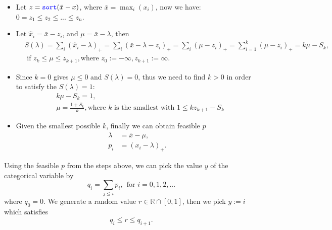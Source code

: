 \documentclass[12pt]{article}
\begin{document}
\begin{itemize}
	\item Let $z = \codeword{sort}(\bar{x} - x)$, where $\bar{x} = \max_i(x_i)$, now we have: $0=z_1\leq z_2 \leq ... \leq z_n$.
	\item Let $\hat{x}_i = \bar{x} - z_i$, and $\mu = \bar{x} - \lambda$, then
	\begin{equation*}
		\begin{split}
			&S(\lambda) = \sum_i (\hat{x}_i - \lambda)_+ = \sum_i (\bar{x} - \lambda - z_i)_+ = \sum_i (\mu - z_i)_+ = \sum_{i=1}^k (\mu - z_i)_+ = k\mu - S_k, \\
			&\text{ if } z_k \leq \mu \leq z_{k+1}, \text{where }z_0 := -\infty, z_{k+1} := \infty.
		\end{split}
	\end{equation*}
	\item Since $k=0$ gives $\mu \leq 0$ and $S(\lambda) = 0$, thus we need to find $k>0$ in order to satisfy the $S(\lambda) = 1$:
	\begin{equation*}
		\begin{split}
			&k\mu - S_k=1, \\
			&\mu = \frac{1+S_k}{k}, \text{where $k$ is the smallest with } 1 \leq kz_{k+1} - S_k
		\end{split}
	\end{equation*}
	\item Given the smallest possible $k$, finally we can obtain feasible $p$
	\begin{equation*}
		\begin{split}
			\lambda &= \bar{x} - \mu, \\
			p_i &= (x_i - \lambda)_+.	
		\end{split}
	\end{equation*}
\end{itemize}
Using the feasible $p$ from the steps above, we can pick the value $y$ of the categorical variable by
\begin{equation*}
	q_i = \sum_{j\leq i} p_i,~~ \text{for }i = 0,1,2,...
\end{equation*}
where $q_0 = 0$. We generate a random value $r \in \mathbb{R} \cap [0,1]$, then we pick $y := i$ which satisfies
\begin{equation*}
	q_i \leq r \leq q_{i+1}.
\end{equation*}
\end{document}
